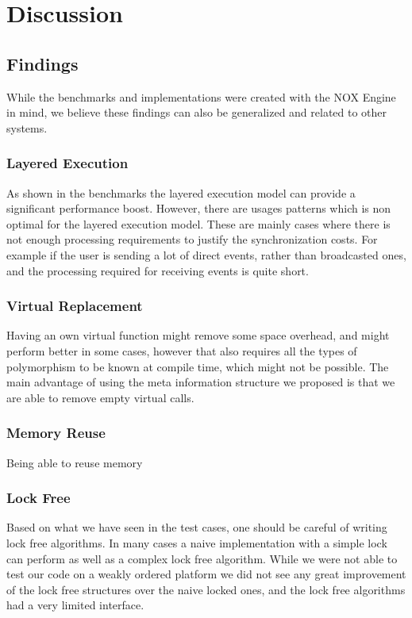 \chapter{Discussion}
\label{chap:discussion}

\section{Findings}
While the benchmarks and implementations were created with the NOX Engine in mind,
we believe these findings can also be generalized and related to other systems.

\subsection{Layered Execution}
As shown in the benchmarks the layered execution model can provide a significant performance boost.
However, there are usages patterns which is non optimal for the layered execution model.
These are mainly cases where there is not enough processing requirements to justify the synchronization costs.
For example if the user is sending a lot of direct events, rather than broadcasted ones,
and the processing required for receiving events is quite short.

\subsection{Virtual Replacement}
Having an own virtual function might remove some space overhead, and might perform better in some cases,
however that also requires all the types of polymorphism to be known at compile time, which might
not be possible.
The main advantage of using the meta information structure we proposed is that we are able to remove empty
virtual calls.

\subsection{Memory Reuse}
Being able to reuse memory

\subsection{Lock Free}
Based on what we have seen in the test cases, one should be careful of writing lock free algorithms.
In many cases a naive implementation with a simple lock can perform as well as a complex lock free algorithm.
While we were not able to test our code on a weakly ordered platform we did not see any great improvement
of the lock free structures over the naive locked ones, and the lock free algorithms had a very limited interface.

